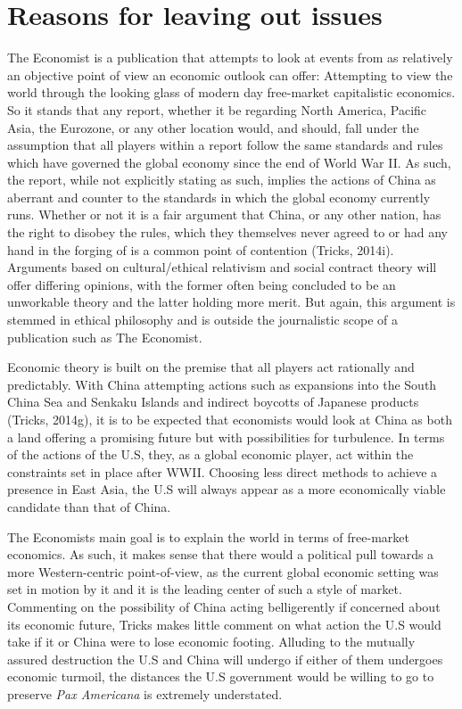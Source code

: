 \documentclass[man,donotrepeattitle,letter]{apa6}
\begin{document}
\section{Reasons for leaving out issues}
The Economist is a publication that attempts to look at events from as relatively an objective point of view an economic outlook can offer:  Attempting to view the world through the looking glass of modern day free-market capitalistic economics.  So it stands that any report, whether it be regarding North America, Pacific Asia, the Eurozone, or any other location would, and should, fall under the assumption that all players within a report follow the same standards and rules which have governed the global economy since the end of World War II.  As such, the report, while not explicitly stating as such, implies the actions of China as aberrant and counter to the standards in which the global economy currently runs.  Whether or not it is a fair argument that China, or any other nation, has the right to disobey the rules, which they themselves never agreed to or had any hand in the forging of is a common point of contention (Tricks, 2014i).  Arguments based on cultural/ethical relativism and social contract theory will offer differing opinions, with the former often being concluded to be an unworkable theory and the latter holding more merit. But again, this argument is stemmed in ethical philosophy and is outside the journalistic scope of a publication such as The Economist.

Economic theory is built on the premise that all players act rationally and predictably.  With China attempting actions such as expansions into the South China Sea and Senkaku Islands and indirect boycotts of Japanese products (Tricks, 2014g), it is to be expected that economists would look at China as both a land offering a promising future but with possibilities for turbulence. In terms of the actions of the U.S, they, as a global economic player, act within the constraints set in place after WWII.  Choosing less direct methods to achieve a presence in East Asia, the U.S will always appear as a more economically viable candidate than that of China.

The Economists main goal is to explain the world in terms of free-market economics. As such, it makes sense that there would a political pull towards a more Western-centric point-of-view, as the current global economic setting was set in motion by it and it is the leading center of such a style of market.  Commenting on the possibility of China acting belligerently if concerned about its economic future, Tricks makes little comment on what action the U.S would take if it or China were to lose economic footing. Alluding to the mutually assured destruction the U.S and China will undergo if either of them undergoes economic turmoil, the distances the U.S government would be willing to go to preserve \textit{Pax Americana} is extremely understated.
\end{document}
